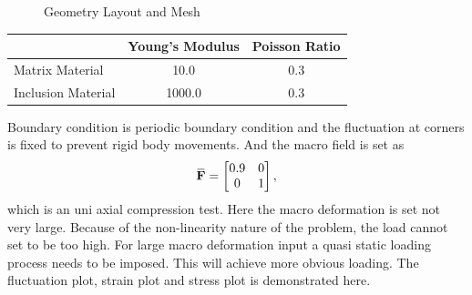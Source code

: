 \documentclass[10pt,a4paper]{scrreprt}
\newcommand{\overbar}[1]{\mkern 1.5mu\overline{\mkern-1.5mu#1\mkern-1.5mu}\mkern 1.5mu}
\begin{document}
\begin{figure}[h]
  \centering
  \caption{Geometry Layout and Mesh}
  \label{fig: inc}
\end{figure} 

\begin{center}
\begin{tabular}{l|c|c}
\hline
& Young's Modulus & Poisson Ratio \\
\hline
Matrix Material & 10.0 & 0.3 \\
Inclusion Material & 1000.0 & 0.3 \\
\hline
\end{tabular}
\end{center}
Boundary condition is periodic boundary condition and the fluctuation at corners is fixed to prevent rigid body movements. And the macro field is set as 
\[
\overbar{\mathbf{F}} = 
\begin{bmatrix}
0.9 & 0 \\
0 & 1 \\
\end{bmatrix},
\]
which is an uni axial compression test. Here the macro deformation is set not very large. Because of the non-linearity nature of the problem, the load cannot set to be too high. For large macro deformation input a quasi static loading process needs to be imposed. This will achieve more obvious loading. The fluctuation plot, strain plot and stress plot is demonstrated here.
\end{document}
